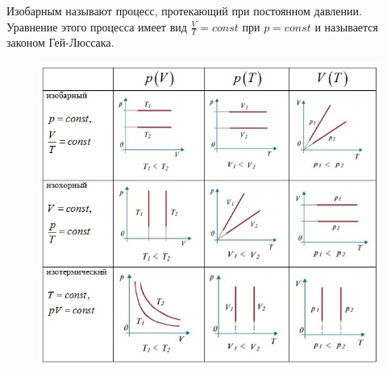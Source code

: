 \begin{definition}
    Изобарным называют процесс, протекающий при постоянном давлении. 
    Уравнение этого процесса имеет вид $\frac{V}{T} = const$ при $p = const$ и называется законом Гей-Люссака.
\end{definition}

\begin{figure}[h]
    \centering
    \includegraphics[width=0.4\linewidth]{imgs/q13i1.jpg}
\end{figure}


